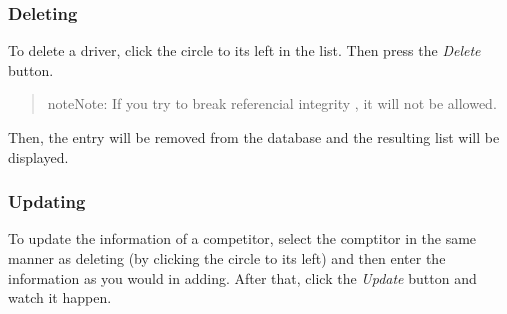 \documentclass[a4paper,10pt,english]{sphinxmanual}
\begin{document}
\subsubsection{Deleting}
\label{user/member2:deleting}
To delete a driver, click the circle to its left in the list. Then press the \emph{Delete} button.
\begin{quote}


\begin{notice}{note}{Note:}
If you try to break referencial integrity , it will not be allowed.
\end{notice}
\end{quote}

Then, the entry will be removed from the database and the resulting list will be displayed.


\subsubsection{Updating}
\label{user/member2:updating}
To update the information of a competitor, select the comptitor in the same manner as deleting (by clicking the circle to its left) and then enter the information as you would in adding. After that, click the \emph{Update} button and watch it happen.
\begin{quote}

\end{quote}
\end{document}

